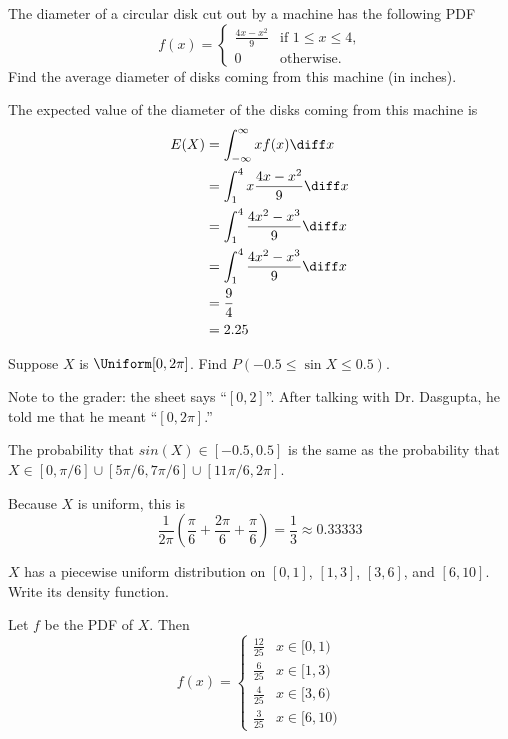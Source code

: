\begin{problem}[Handout 12, \# 8]
  The diameter of a circular disk cut out by a machine has the following
  PDF
  \[
    f(x)=%
    \begin{cases}
      \frac{4x-x^2}{9}&\text{if \(1\leq x\leq 4\),}\\
      0&\text{otherwise.}
    \end{cases}
  \]
  Find the average diameter of disks coming from this machine (in inches).
\end{problem}
\begin{solution}
  The expected value of the diameter of the disks coming from this machine
  is
  \begin{align*}
    E(X) &= \int_{-\infty}^\infty xf(x) \diff x\\
         &= \int_1^4 x \frac{4x-x^2}{9} \diff x\\
         &= \int_1^4 \frac{4x^2-x^3}{9} \diff x\\
         &= \int_1^4 \frac{4x^2-x^3}{9} \diff x\\
         &= \frac{9}{4}\\
         &= 2.25
  \end{align*}
\end{solution}
\newpage

\begin{problem}[Handout 12, \# 9]
  Suppose \(X\) is \(\Uniform[0,2 \pi]\). Find
  \(P(-0.5\leq \sin X\leq 0.5)\).
\end{problem}
\begin{solution}

  Note to the grader: the sheet says ``$[0,2]$''. After talking with
  Dr. Dasgupta, he told me that he meant ``$[0,2\pi]$.''

  The probability that $sin(X) \in [-0.5,0.5]$ is the same as the
  probability that
  $X \in [0,\pi/6] \cup [5\pi/6,7\pi/6] \cup [11\pi/6,2\pi]$.

  Because $X$ is uniform, this is
  \[
    \frac{1}{2\pi} \left(\frac{\pi}{6} + \frac{2\pi}{6} +
      \frac{\pi}{6}\right) = \frac{1}{3} \approx 0.33333
  \]

\end{solution}
\newpage

\begin{problem}[Handout 12, \# 13]
  \(X\) has a piecewise uniform distribution on \([0,1]\), \([1,3]\),
  \([3,6]\), and \([6,10]\). Write its density function.
\end{problem}
\begin{solution}
  Let $f$ be the PDF of $X$. Then
  \[
    f(x) =
    \begin{cases}
      \frac{12}{25}&x\in[0,1)\\
      \frac{6}{25}&x\in[1,3)\\
      \frac{4}{25}&x\in[3,6)\\
      \frac{3}{25}&x\in[6,10)
    \end{cases}
  \]
\end{solution}
\newpage

